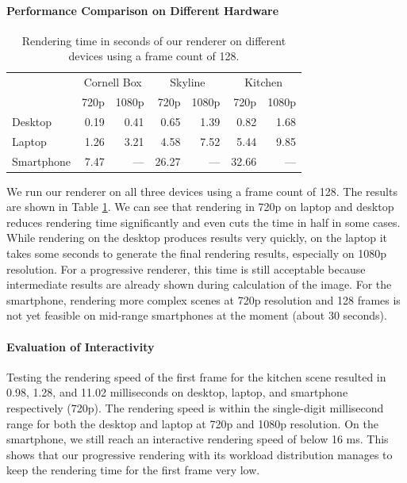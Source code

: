 \documentclass[sigconf,authorversion]{acmart}
\begin{document}
\paragraph{Performance Comparison on Different Hardware}
\begin{table}[b]
    \centering
    \caption{Rendering time in seconds of our renderer on different devices using a frame count of 128.}
    \begin{tabular}{l|*{6}{r}}
        & \multicolumn{2}{c}{Cornell Box} & \multicolumn{2}{c}{Skyline} &  \multicolumn{2}{c}{Kitchen}\\
        & 720p & 1080p & 720p & 1080p & 720p & 1080p\\\hline
        Desktop    & 0.19 & 0.41 &  0.65 & 1.39 &  0.82 & 1.68 \\
        Laptop     & 1.26 & 3.21 &  4.58 & 7.52 &  5.44 & 9.85 \\
        Smartphone & 7.47 &  --- & 26.27 &  --- & 32.66 &  ---
    \end{tabular}
    \label{tab:performance_different_devices}
\end{table}
We run our renderer on all three devices using a frame count of 128.
The results are shown in Table \ref{tab:performance_different_devices}.
We can see that rendering in 720p on laptop and desktop reduces rendering time significantly and even cuts the time in half in some cases.
While rendering on the desktop produces results very quickly, on the laptop it takes some seconds to generate the final rendering results, especially on 1080p resolution.
For a progressive renderer, this time is still acceptable because intermediate results are already shown during calculation of the image.
For the smartphone, rendering more complex scenes at 720p resolution and 128 frames is not yet feasible on mid-range smartphones at the moment (about 30 seconds).

\paragraph{Evaluation of Interactivity}
Testing the rendering speed of the first frame for the kitchen scene resulted in 0.98, 1.28, and 11.02 milliseconds on desktop, laptop, and smartphone respectively (720p).
The rendering speed is within the single-digit millisecond range for both the desktop and laptop at 720p and 1080p resolution.
On the smartphone, we still reach an interactive rendering speed of below 16 ms.
This shows that our progressive rendering with its workload distribution manages to keep the rendering time for the first frame very low.
\end{document}
